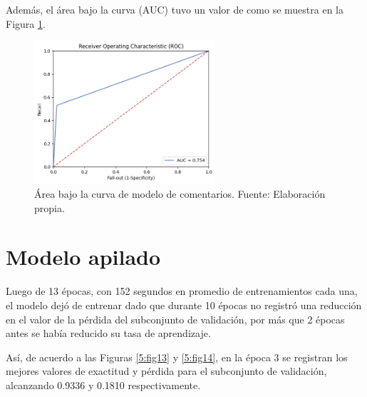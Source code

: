 Además, el área bajo la curva (AUC) tuvo un valor de como se muestra en la Figura \ref{5:fig12}.

\begin{figure}[!ht]
	\begin{center}
		\includegraphics[width=0.60\textwidth]{4/figures/comments_auc.png}
		\caption{Área bajo la curva de modelo de comentarios. Fuente: Elaboración propia.}
		\label{5:fig12}
	\end{center}
\end{figure}

\section{Modelo apilado}
Luego de 13 épocas, con 152 segundos en promedio de entrenamientos cada una, el modelo dejó de entrenar dado que durante 10 épocas no registró una reducción en el valor de la pérdida del subconjunto de validación, por más que 2 épocas antes se había reducido su tasa de aprendizaje.

Así, de acuerdo a las Figuras \ref{5:fig13} y \ref{5:fig14}, en la época 3 se registran los mejores valores de exactitud y pérdida para el subconjunto de validación, alcanzando 0.9336 y 0.1810 respectivamente.

